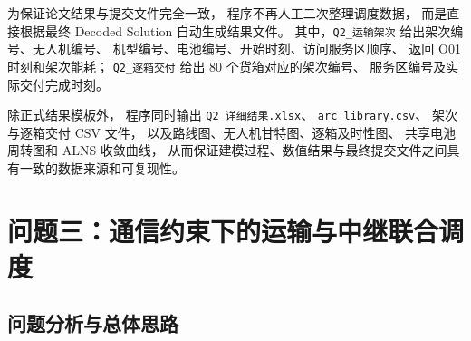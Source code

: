 为保证论文结果与提交文件完全一致，
程序不再人工二次整理调度数据，
而是直接根据最终 Decoded Solution 自动生成结果文件。
其中，\texttt{Q2\_运输架次} 给出架次编号、无人机编号、
机型编号、电池编号、开始时刻、访问服务区顺序、
返回 O01 时刻和架次能耗；
\texttt{Q2\_逐箱交付} 给出 80 个货箱对应的架次编号、
服务区编号及实际交付完成时刻。

除正式结果模板外，
程序同时输出
\texttt{Q2\_详细结果.xlsx}、
\texttt{arc\_library.csv}、
架次与逐箱交付 CSV 文件，
以及路线图、无人机甘特图、逐箱及时性图、
共享电池周转图和 ALNS 收敛曲线，
从而保证建模过程、数值结果与最终提交文件之间具有一致的数据来源和可复现性。


\newcommand{\QThreeSeed}{20260924}
\newcommand{\QThreeTransportIter}{0}
\newcommand{\QThreeJointIter}{20}

\newcommand{\QThreeBaseLate}{1131.054}
\newcommand{\QThreeBaseMakespan}{26461.112}
\newcommand{\QThreeBaseMakespanHour}{7.350}
\newcommand{\QThreeBaseEnergy}{90.744}
\newcommand{\QThreeBaseTrips}{38}

\newcommand{\QThreeLate}{752.950}
\newcommand{\QThreeMakespan}{26243.895}
\newcommand{\QThreeMakespanHour}{7.290}
\newcommand{\QThreeTransportEnergy}{83.015}
\newcommand{\QThreeRelayEnergy}{7.060}
\newcommand{\QThreeEnergy}{90.075}
\newcommand{\QThreeTransportTrips}{25}
\newcommand{\QThreeRelayTrips}{13}
\newcommand{\QThreeTrips}{38}
\newcommand{\QThreeHardViolation}{0}
\newcommand{\QThreeCommOutage}{0}
\newcommand{\QThreeScore}{0.846041}

\newcommand{\QThreeLateImprove}{33.43\%}
\newcommand{\QThreeMakespanImprove}{0.82\%}
\newcommand{\QThreeEnergyImprove}{0.74\%}
\newcommand{\QThreeScoreImprove}{15.40\%}

\section{问题三：通信约束下的运输与中继联合调度}
\label{sec:q3}

\subsection{问题分析与总体思路}

